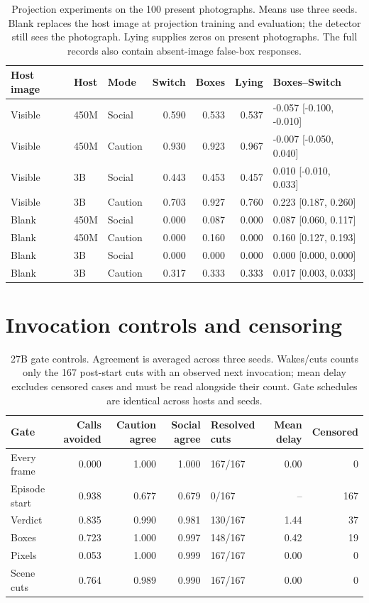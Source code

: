 \documentclass[10pt]{article}
\begin{document}
\begin{table}[htbp]\centering\small
\caption{Projection experiments on the 100 present photographs.
Means use three seeds. Blank replaces the host image at
projection training and evaluation; the detector still sees
the photograph. Lying supplies zeros on present photographs.
The full records also contain absent-image false-box responses.}
\label{tab:boxes}
\begin{tabular}{lllrrrl}\toprule
Host image & Host & Mode & Switch & Boxes & Lying & Boxes--Switch\\\midrule
Visible & 450M & Social & 0.590 & 0.533 & 0.537 & -0.057 [-0.100, -0.010] \\
Visible & 450M & Caution & 0.930 & 0.923 & 0.967 & -0.007 [-0.050, 0.040] \\
Visible & 3B & Social & 0.443 & 0.453 & 0.457 & 0.010 [-0.010, 0.033] \\
Visible & 3B & Caution & 0.703 & 0.927 & 0.760 & 0.223 [0.187, 0.260] \\
Blank & 450M & Social & 0.000 & 0.087 & 0.000 & 0.087 [0.060, 0.117] \\
Blank & 450M & Caution & 0.000 & 0.160 & 0.000 & 0.160 [0.127, 0.193] \\
Blank & 3B & Social & 0.000 & 0.000 & 0.000 & 0.000 [0.000, 0.000] \\
Blank & 3B & Caution & 0.317 & 0.333 & 0.333 & 0.017 [0.003, 0.033] \\

\bottomrule\end{tabular}
\end{table}

\section{Invocation controls and censoring}
\begin{table}[htbp]\centering\small
\caption{27B gate controls. Agreement is averaged across three
seeds. Wakes/cuts counts only the 167 post-start cuts with an
observed next invocation; mean delay excludes censored cases
and must be read alongside their count. Gate schedules are
identical across hosts and seeds.}\label{tab:gate-controls}
\begin{tabular}{lrrrlrr}\toprule
Gate & Calls avoided & Caution agree & Social agree &
Resolved cuts & Mean delay & Censored\\\midrule
Every frame & 0.000 & 1.000 & 1.000 & 167/167 & 0.00 & 0 \\
Episode start & 0.938 & 0.677 & 0.679 & 0/167 & -- & 167 \\
Verdict & 0.835 & 0.990 & 0.981 & 130/167 & 1.44 & 37 \\
Boxes & 0.723 & 1.000 & 0.997 & 148/167 & 0.42 & 19 \\
Pixels & 0.053 & 1.000 & 0.999 & 167/167 & 0.00 & 0 \\
Scene cuts & 0.764 & 0.989 & 0.990 & 167/167 & 0.00 & 0 \\

\bottomrule\end{tabular}
\end{table}
\end{document}
